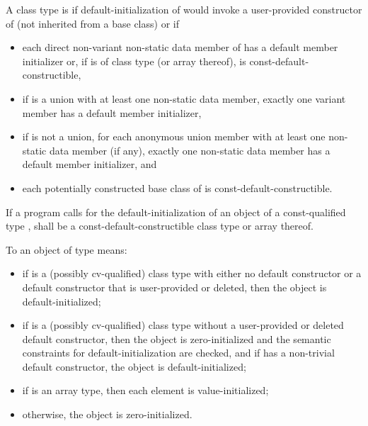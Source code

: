 A class type  is  if
default-initialization of  would invoke
a user-provided constructor of  (not inherited from a base class)
or if

\begin{itemize}
\item
each direct non-variant non-static data member  of 
has a default member initializer
or, if  is of class type  (or array thereof),
 is const-default-constructible,
\item
if  is a union with at least one non-static data member,
exactly one variant member has a default member initializer,
\item
if  is not a union,
for each anonymous union member with at least one non-static data member (if any),
exactly one non-static data member has a default member initializer, and
\item
each potentially constructed base class of  is const-default-constructible.
\end{itemize}

If a program calls for the default-initialization of an object of a
const-qualified type ,
 shall be a const-default-constructible class type or array thereof.

\pnum
To
an object of type
means:

\begin{itemize}
\item
if
is a (possibly cv-qualified) class type with
either no default constructor or a default
constructor that is user-provided or deleted, then the object is default-initialized;

\item
if
is a (possibly cv-qualified) class type without a
user-provided or deleted default constructor,
then the object is zero-initialized and the semantic constraints for
default-initialization are checked, and if  has a
non-trivial default constructor, the object is default-initialized;

\item
if
is an array type, then each element is value-initialized;

\item
otherwise, the object is zero-initialized.
\end{itemize}


